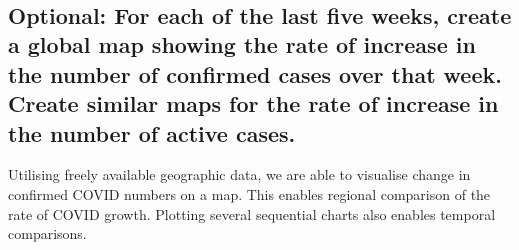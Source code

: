 \documentclass[8pt]{article}
\begin{document}
    \begin{center}
    \end{center}
    { \hspace*{\fill} \\}
    
    \subsection{Optional: For each of the last five weeks, create a global map showing the rate of increase in the number of confirmed cases over that week. Create similar maps for the rate of increase in the number of active cases.}
Utilising freely available geographic data, we are able to visualise change in confirmed COVID numbers on a map. This enables regional comparison of the rate of COVID growth. Plotting several sequential charts also enables temporal comparisons.
\end{document}

